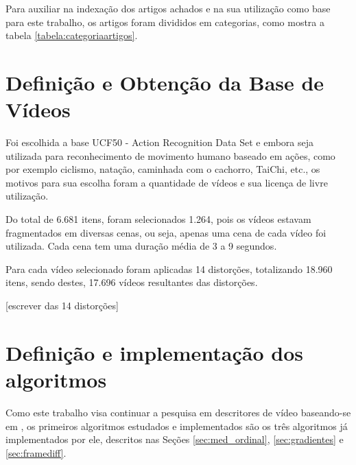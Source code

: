 Para auxiliar na indexação dos artigos achados e na sua utilização como base para este trabalho, os artigos foram divididos em categorias, como mostra a tabela \ref{tabela:categoriaartigos}.

\begin{table}[h]
    \caption{Categorização dos artigos.}
    \label{tabela:categoriaartigos}
\end{table}

\section{Definição e Obtenção da Base de Vídeos}

Foi escolhida a base UCF50 - Action Recognition Data Set \citeauthor{reddy2013recognizing} e embora seja utilizada para reconhecimento de movimento humano baseado em ações, como por exemplo ciclismo, natação, caminhada com o cachorro, TaiChi, etc., os motivos para sua escolha foram a quantidade de vídeos e sua licença de livre utilização. 

Do total de 6.681 itens, foram selecionados 1.264, pois os vídeos estavam fragmentados em diversas cenas, ou seja, apenas uma cena de cada vídeo foi utilizada. Cada cena tem uma duração média de 3 a 9 segundos.

Para cada vídeo selecionado foram aplicadas 14 distorções, totalizando 18.960 itens, sendo destes, 17.696 vídeos resultantes das distorções.

[escrever das 14 distorções]

\section{Definição e implementação dos algoritmos}

Como este trabalho visa continuar a pesquisa em descritores de vídeo baseando-se em \citeauthor{sylvio2015}, os primeiros algoritmos estudados e implementados são os três algoritmos já implementados por ele, descritos nas Seções \ref{sec:med_ordinal}, \ref{sec:gradientes} e \ref{sec:framediff}.

